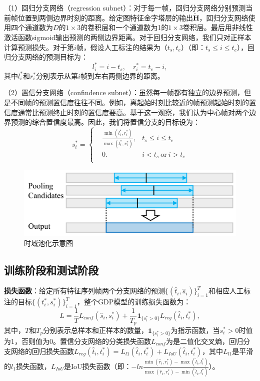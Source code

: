 （1）回归分支网络（regression subnet）：对于每一帧，回归分支网络分别预测当前帧位置到两侧边界时刻的距离。给定图特征金字塔层的输出$\tilde{\bm{H}}$，回归分支网络使用四个通道数为$D$的$1\times3$的卷积层和一个通道数为1的$1\times3$卷积层。最后用非线性激活函数sigmoid输出预测的两侧边界距离。对于回归分支网络，我们只对正样本计算预测损失。对于第$i$帧，假设人工标注的结果为（$t_s, t_e$）（即：$t_s \leq i \leq t_e$），回归分支网络的预测目标为：
\begin{equation}
    l^*_i = i - t_s, \quad r^*_i = t_e - i,
\end{equation}
其中$l^*_i$和$r^*_i$分别表示从第$i$帧到左右两侧边界的距离。

（2）置信分支网络（confindence subnet）：虽然每一帧都有独立的边界预测，但是不同帧的预测置信度往往不同。例如，离起始时刻比较近的帧预测起始时刻的置信度通常比预测终止时刻的置信度要高。基于这一观察，我们认为中心帧对两个边界预测的综合置信度最高。因此，我们将置信分支的目标设为：
\begin{equation}
s^*_i=\left\{
    \begin{aligned}
        & \frac{\min(l^*_i, r^*_i)}{\max(l^*_i, r^*_i)}, & t_s \leq i \leq t_e \\
        & 0.  & i < t_s ~\text{or}~ i > t_e \\
    \end{aligned}
    \right.
\end{equation}

\begin{figure}[t]
    \centering
    \includegraphics[width=0.8\linewidth]{chapter6/res/temporal_pooling.pdf}
    \caption{时域池化示意图}
    \label{ch6:fig:temporal_pooling}
\end{figure}

\subsection{训练阶段和测试阶段}

\textbf{损失函数}：给定所有特征序列帧两个分支网络的预测$\{(\hat{t}_i, \hat{s}_i)\}^T_{i=1}$和相应人工标注的目标$\{(t^*_i, s^*_i)\}^T_{i=1}$，整个GDP模型的训练损失函数为：
\begin{equation}
    L = \frac{1}{T}L_{conf}(\hat{s}_i, s^*_i) + \frac{1}{T_p}\mathbf{1}_{\{s^*_i>0\}}L_{reg}(\hat{t}_i, t^*_i),
\end{equation}
其中，$T$和$T_p$分别表示总样本和正样本的数量，$\mathbf{1}_{\{s^*_i>0\}}$为指示函数，当$s^*_i>0$时值为1，否则值为0。置信分支网络的分类损失函数$L_{conf}$为是二值化交叉熵，回归分支网络的回归损失函数$L_{reg}(\hat{t}_i, t^*_i) = L_{l1}(\hat{t}_i, t^*_i) + L_{IoU}(\hat{t}_i, t^*_i)$，其中$L_{l1}$是平滑的$l_1$损失函数，$L_{IoU}$是IoU损失函数（即：$-ln\frac{\min(\hat{r}_i, r^*_i)-\max(\hat{l}_i, l^*_i)}{\max(\hat{r}_i, r^*_i)-\min(\hat{l}_i, l^*_i)}$）。



